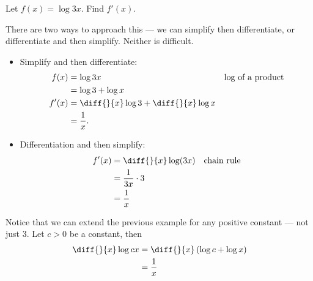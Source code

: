 \begin{eg}
 Let $f(x) = \log 3x$. Find $f'(x)$.

There are two ways to approach this --- we can simplify then differentiate, or
differentiate and then simplify. Neither is difficult.
\begin{itemize}
 \item Simplify and then differentiate:
  \begin{align*}
  f(x) &= \log 3x & \text{log of a product} \\
  &= \log 3 + \log x \\
  f'(x) &= \diff{}{x} \log 3 + \diff{}{x} \log x \\
  &= \frac{1}{x}.
\end{align*}
\item Differentiation and then simplify:
  \begin{align*}
  f'(x) &= \diff{}{x} \log(3x) & \text{chain rule} \\
  &= \frac{1}{3x} \cdot 3 \\
  &= \frac{1}{x}
\end{align*}
\end{itemize}
\end{eg}
\begin{eg}
Notice that we can extend the previous example for any positive constant --- not
just 3. Let $c>0$ be a constant, then
\begin{align*}
  \diff{}{x} \log cx &= \diff{}{x}\left(\log c + \log x \right)\\
  &= \frac{1}{x}
\end{align*}
\end{eg}
